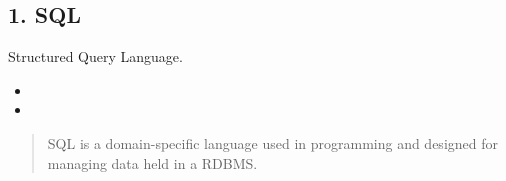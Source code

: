 \documentclass[aspectratio=169, 14pt]{beamer}
\begin{document}
{
    \begin{frame}
        \section{\textcolor{darkmidnightblue}{1. SQL}}
        Structured Query Language.

        \begin{itemize}
            \item {}
            \item {}
        \end{itemize}
        \bigskip

        \pause
        \begin{quote}
    SQL is a domain-specific language used in programming and designed for managing data held in a RDBMS.           
        \end{quote}
    \end{frame}
}
\end{document}
